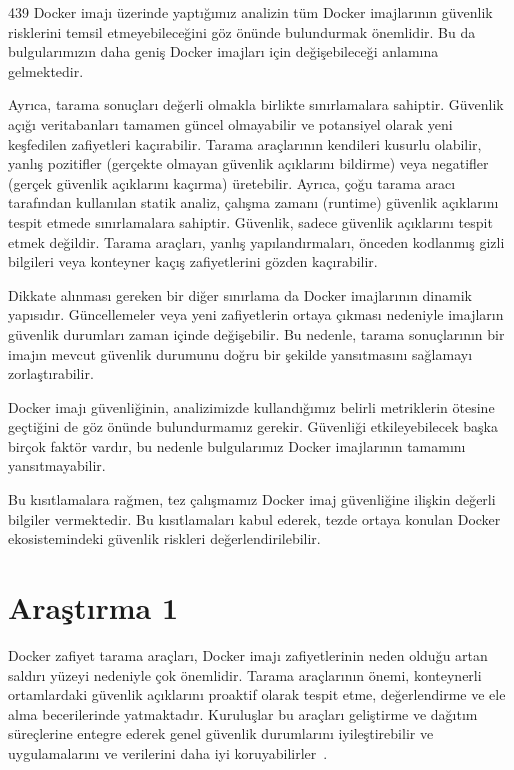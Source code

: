 439 Docker imajı üzerinde yaptığımız analizin tüm Docker imajlarının güvenlik risklerini temsil etmeyebileceğini göz önünde bulundurmak önemlidir. Bu da bulgularımızın daha geniş Docker imajları için değişebileceği anlamına gelmektedir.

Ayrıca, tarama sonuçları değerli olmakla birlikte sınırlamalara sahiptir. Güvenlik açığı veritabanları tamamen güncel olmayabilir ve potansiyel olarak yeni keşfedilen zafiyetleri kaçırabilir. Tarama araçlarının kendileri kusurlu olabilir, yanlış pozitifler (gerçekte olmayan güvenlik açıklarını bildirme) veya negatifler (gerçek güvenlik açıklarını kaçırma) üretebilir. Ayrıca, çoğu tarama aracı tarafından kullanılan statik analiz, çalışma zamanı (runtime) güvenlik açıklarını tespit etmede sınırlamalara sahiptir. Güvenlik, sadece güvenlik açıklarını tespit etmek değildir. Tarama araçları, yanlış yapılandırmaları, önceden kodlanmış gizli bilgileri veya konteyner kaçış zafiyetlerini gözden kaçırabilir.

Dikkate alınması gereken bir diğer sınırlama da Docker imajlarının dinamik yapısıdır. Güncellemeler veya yeni zafiyetlerin ortaya çıkması nedeniyle imajların güvenlik durumları zaman içinde değişebilir. Bu nedenle, tarama sonuçlarının bir imajın mevcut güvenlik durumunu doğru bir şekilde yansıtmasını sağlamayı zorlaştırabilir.

Docker imajı güvenliğinin, analizimizde kullandığımız belirli metriklerin ötesine geçtiğini de göz önünde bulundurmamız gerekir. Güvenliği etkileyebilecek başka birçok faktör vardır, bu nedenle bulgularımız Docker imajlarının tamamını yansıtmayabilir.

Bu kısıtlamalara rağmen, tez çalışmamız Docker imaj güvenliğine ilişkin değerli bilgiler vermektedir. Bu kısıtlamaları kabul ederek, tezde ortaya konulan Docker ekosistemindeki güvenlik riskleri değerlendirilebilir.

\chapter{Araştırma 1}\label{ch:arastirma1}

Docker zafiyet tarama araçları, Docker imajı zafiyetlerinin neden olduğu artan saldırı yüzeyi nedeniyle çok önemlidir. Tarama araçlarının önemi, konteynerli ortamlardaki güvenlik açıklarını proaktif olarak tespit etme, değerlendirme ve ele alma becerilerinde yatmaktadır. Kuruluşlar bu araçları geliştirme ve dağıtım süreçlerine entegre ederek genel güvenlik durumlarını iyileştirebilir ve uygulamalarını ve verilerini daha iyi koruyabilirler~\autocite{sultan2019}.

